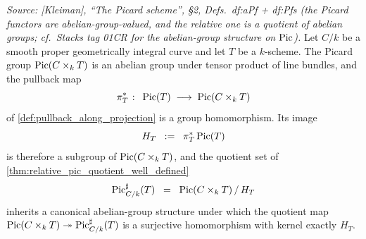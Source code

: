 \begin{lemma}\leanok
  \label{lem:rel_pic_sharp_groupoid}

  \textit{Source: [Kleiman], ``The Picard scheme'', \S 2,
  Defs.~df:aPf + df:Pfs (the Picard functors are abelian-group-valued, and the
  relative one is a quotient of abelian groups; cf.\ Stacks tag 01CR for the
  abelian-group structure on \(\operatorname{Pic}\)).}
  Let \(C/k\) be a smooth proper geometrically integral curve and let \(T\) be a
  \(k\)-scheme. The Picard group \(\operatorname{Pic}(C \times_k T)\) is an abelian group under
  tensor product of line bundles, and the pullback map
  \[
    \pi_T^* \;\colon\; \operatorname{Pic}(T) \;\longrightarrow\; \operatorname{Pic}(C \times_k T)
  \]
  of \cref{def:pullback_along_projection} is a group homomorphism. Its image
  \[
    H_T \;\;:=\;\; \pi_T^* \operatorname{Pic}(T)
  \]
  is therefore a subgroup of \(\operatorname{Pic}(C \times_k T)\), and the quotient set of
  \cref{thm:relative_pic_quotient_well_defined}
  \[
    \operatorname{Pic}^\sharp_{C/k}(T) \;\;=\;\; \operatorname{Pic}(C \times_k T) \, / \, H_T
  \]
  inherits a canonical abelian-group structure under which the quotient map
  \(\operatorname{Pic}(C \times_k T) \twoheadrightarrow \operatorname{Pic}^\sharp_{C/k}(T)\) is a surjective
  homomorphism with kernel exactly \(H_T\).
\end{lemma}


